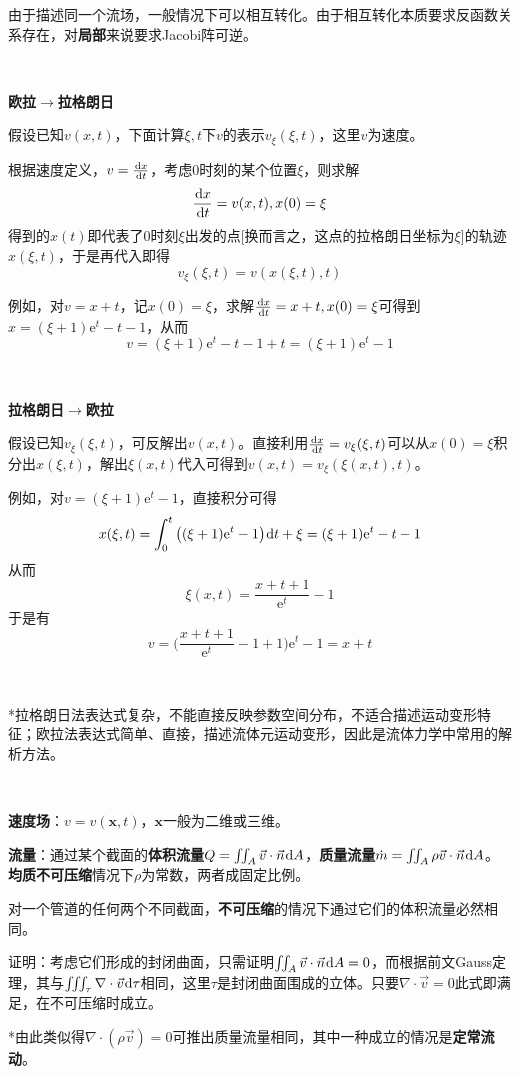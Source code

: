 \documentclass[a4paper,UTF8,fontset=windows]{ctexart}
\newcommand*{\dr}{\hspace{0.07em}\mathrm{d}}
\begin{document}
由于描述同一个流场，一般情况下可以相互转化。由于相互转化本质要求反函数关系存在，对\textbf{局部}来说要求Jacobi阵可逆。

\

\textbf{欧拉$\to$拉格朗日}

假设已知$v(x,t)$，下面计算$\xi,t$下$v$的表示$v_\xi(\xi,t)$，这里$v$为速度。

根据速度定义，$v=\frac{\dr x}{\dr t}$，考虑0时刻的某个位置$\xi$，则求解
$$\frac{\dr x}{\dr t}=v(x,t),x(0)=\xi$$
得到的$x(t)$即代表了0时刻$\xi$出发的点[换而言之，这点的拉格朗日坐标为$\xi$]的轨迹$x(\xi,t)$，于是再代入即得
$$v_\xi(\xi,t)=v(x(\xi,t),t)$$

例如，对$v=x+t$，记$x(0)=\xi$，求解$\frac{\dr x}{\dr t}=x+t,x(0)=\xi$可得到$x=(\xi+1)\mathrm{e}^t-t-1$，从而
$$v=(\xi+1)\mathrm{e}^t-t-1+t=(\xi+1)\mathrm{e}^t-1$$

\

\textbf{拉格朗日$\to$欧拉}

假设已知$v_\xi(\xi,t)$，可反解出$v(x,t)$。直接利用$\frac{\dr x}{\dr t}=v_\xi(\xi,t)$可以从$x(0)=\xi$积分出$x(\xi,t)$，解出$\xi(x,t)$代入可得到$v(x,t)=v_\xi(\xi(x,t),t)$。

例如，对$v=(\xi+1)\mathrm{e}^t-1$，直接积分可得
$$x(\xi,t)=\int_0^t\big((\xi+1)\mathrm{e}^t-1\big)\dr t+\xi=(\xi+1)\mathrm{e}^t-t-1$$
从而
$$\xi(x,t)=\frac{x+t+1}{\mathrm{e}^t}-1$$
于是有
$$v=\bigg(\frac{x+t+1}{\mathrm{e}^t}-1+1\bigg)\mathrm{e}^t-1=x+t$$

\

*拉格朗日法表达式复杂，不能直接反映参数空间分布，不适合描述运动变形特征；欧拉法表达式简单、直接，描述流体元运动变形，因此是流体力学中常用的解析方法。

\

\textbf{速度场}：$v=v(\mathbf{x},t)$，$\mathbf{x}$一般为二维或三维。

\textbf{流量}：通过某个截面的\textbf{体积流量}$Q=\iint_A\vec{v}\cdot\vec{n}\dr A$，\textbf{质量流量}$\dot{m}=\iint_A\rho\vec{v}\cdot\vec{n}\dr A$。\textbf{均质不可压缩}情况下$\rho$为常数，两者成固定比例。

对一个管道的任何两个不同截面，\textbf{不可压缩}的情况下通过它们的体积流量必然相同。

证明：考虑它们形成的封闭曲面，只需证明$\iint_A\vec{v}\cdot\vec{n}\dr A=0$，而根据前文Gauss定理，其与$\iiint_\tau\nabla\cdot\vec{v}\dr\tau$相同，这里$\tau$是封闭曲面围成的立体。只要$\nabla\cdot\vec{v}=0$此式即满足，在不可压缩时成立。

*由此类似得$\nabla\cdot(\rho\vec{v})=0$可推出质量流量相同，其中一种成立的情况是\textbf{定常流动}。
\end{document}
